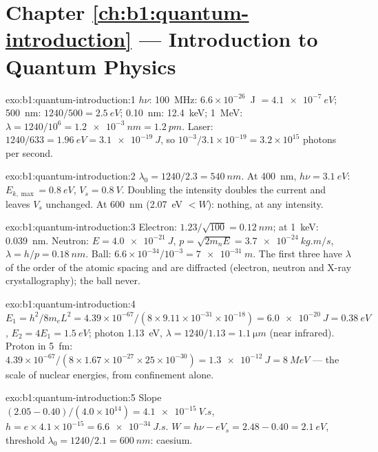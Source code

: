 \section*{Chapter \ref{ch:b1:quantum-introduction} --- Introduction to Quantum Physics}

\begin{solution}{exo:b1:quantum-introduction:1}
$h\nu$: \qty{100}{MHz}: $6.6 \times 10^{-26}$~J $= \qty{4.1e-7}{eV}$; \qty{500}{nm}:
$1240/500 = \qty{2.5}{eV}$; \qty{0.10}{nm}: \qty{12.4}{keV}; \qty{1}{MeV}: $\lambda =
1240/10^6 = \qty{1.2e-3}{nm} = \qty{1.2}{pm}$. Laser: $1240/633 = \qty{1.96}{eV} =
\qty{3.1e-19}{J}$, so $10^{-3}/3.1 \times 10^{-19} = 3.2 \times 10^{15}$ photons per
second.
\end{solution}

\begin{solution}{exo:b1:quantum-introduction:2}
$\lambda_0 = 1240/2.3 = \qty{540}{nm}$. At \qty{400}{nm}, $h\nu = \qty{3.1}{eV}$:
$E_{k,\max} = \qty{0.8}{eV}$, $V_s = \qty{0.8}{V}$. Doubling the intensity
doubles the current and leaves $V_s$ unchanged. At \qty{600}{nm}
(\qty{2.07}{eV} $< W$): nothing, at any intensity.
\end{solution}

\begin{solution}{exo:b1:quantum-introduction:3}
Electron: $1.23/\sqrt{100} = \qty{0.12}{nm}$; at \qty{1}{keV}: \qty{0.039}{nm}.
Neutron: $E = \qty{4.0e-21}{J}$, $p = \sqrt{2m_nE} = \qty{3.7e-24}{kg.m/s}$,
$\lambda = h/p = \qty{0.18}{nm}$. Ball: $6.6 \times 10^{-34}/10^{-3} = \qty{7e-31}{m}$.
The first three have $\lambda$ of the order of the atomic spacing and are
diffracted (electron, neutron and X-ray crystallography); the ball never.
\end{solution}

\begin{solution}{exo:b1:quantum-introduction:4}
$E_1 = h^2/8m_eL^2 = 4.39 \times 10^{-67}/(8 \times 9.11 \times 10^{-31} \times 10^{-18}) =
\qty{6.0e-20}{J} = \qty{0.38}{eV}$, $E_2 = 4E_1 = \qty{1.5}{eV}$; photon
\qty{1.13}{eV}, $\lambda = 1240/1.13 = \qty{1.1}{\micro m}$ (near infrared). Proton
in \qty{5}{fm}: $4.39 \times 10^{-67}/(8 \times 1.67 \times 10^{-27} \times 25 \times 10^{-30}) =
\qty{1.3e-12}{J} = \qty{8}{MeV}$ --- the scale of nuclear energies, from
confinement alone.
\end{solution}

\begin{solution}{exo:b1:quantum-introduction:5}
Slope $(2.05 - 0.40)/(4.0 \times 10^{14}) = \qty{4.1e-15}{V.s}$, $h = e \times 4.1 \times
10^{-15} = \qty{6.6e-34}{J.s}$. $W = h\nu - eV_s = 2.48 - 0.40 = \qty{2.1}{eV}$,
threshold $\lambda_0 = 1240/2.1 = \qty{600}{nm}$: caesium.
\end{solution}

